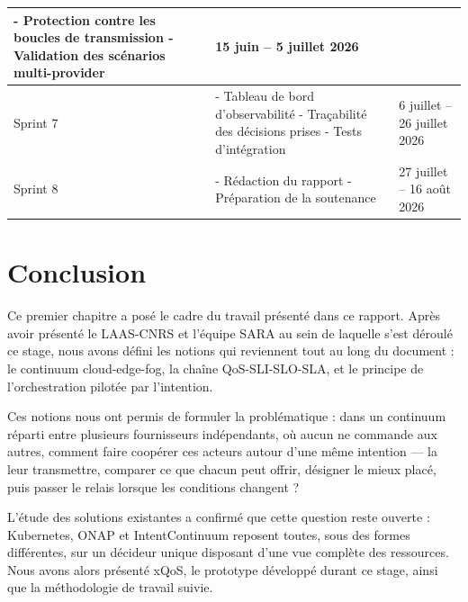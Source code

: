 \begin{table}[H]
\begin{tabular}{p{2cm}p{8.5cm}p{3.5cm}}
        - Protection contre les boucles de transmission \newline
        - Validation des scénarios multi-provider &
        15 juin -- 5 juillet 2026 \\
        \midrule
        Sprint 7 &
        - Tableau de bord d'observabilité \newline
        - Traçabilité des décisions prises \newline
        - Tests d'intégration &
        6 juillet -- 26 juillet 2026 \\
        \midrule
        Sprint 8 &
        - Rédaction du rapport \newline
        - Préparation de la soutenance &
        27 juillet -- 16 août 2026 \\
        \bottomrule
    \end{tabular}
\end{table}
\section{Conclusion}
Ce premier chapitre a posé le cadre du travail présenté dans ce rapport. Après avoir présenté le LAAS-CNRS et l'équipe SARA au sein de laquelle s'est déroulé ce stage, nous avons défini les notions qui reviennent tout au long du document : le continuum cloud-edge-fog, la chaîne QoS-SLI-SLO-SLA, et le principe de l'orchestration pilotée par l'intention.

Ces notions nous ont permis de formuler la problématique : dans un continuum réparti entre plusieurs fournisseurs indépendants, où aucun ne commande aux autres, comment faire coopérer ces acteurs autour d'une même intention — la leur transmettre, comparer ce que chacun peut offrir, désigner le mieux placé, puis passer le relais lorsque les conditions changent ?

L'étude des solutions existantes a confirmé que cette question reste ouverte : Kubernetes, ONAP et IntentContinuum reposent toutes, sous des formes différentes, sur un décideur unique disposant d'une vue complète des ressources. Nous avons alors présenté xQoS, le prototype développé durant ce stage, ainsi que la méthodologie de travail suivie.
